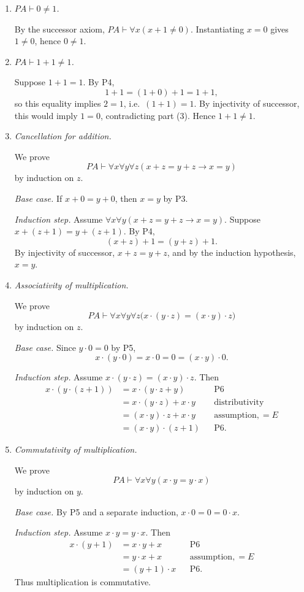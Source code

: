 \documentclass[12pt,fleqn]{article}
\begin{document}
\begin{enumerate}
\item \emph{$PA\vdash 0\neq 1$.}

By the successor axiom, $PA\vdash\forall x(x+1\neq 0)$.
Instantiating $x=0$ gives $1\neq 0$, hence $0\neq 1$.

\item \emph{$PA\vdash 1+1\neq 1$.}

Suppose $1+1=1$. By P4,
\[
1+1=(1+0)+1=1+1,
\]
so this equality implies $2=1$, i.e.\ $(1+1)=1$.
By injectivity of successor, this would imply $1=0$, contradicting
part (3). Hence $1+1\neq 1$.

\item \emph{Cancellation for addition.}

We prove
\[
PA\vdash\forall x\forall y\forall z(x+z=y+z\to x=y)
\]
by induction on $z$.

\emph{Base case.} If $x+0=y+0$, then $x=y$ by P3.

\emph{Induction step.} Assume
$\forall x\forall y(x+z=y+z\to x=y)$.
Suppose $x+(z+1)=y+(z+1)$. By P4,
\[
(x+z)+1=(y+z)+1.
\]
By injectivity of successor, $x+z=y+z$, and by the induction hypothesis,
$x=y$.

\item \emph{Associativity of multiplication.}

We prove
\[
PA\vdash\forall x\forall y\forall z\bigl(x\cdot(y\cdot z)=(x\cdot y)\cdot z\bigr)
\]
by induction on $z$.

\emph{Base case.} Since $y\cdot 0=0$ by P5,
\[
x\cdot(y\cdot 0)=x\cdot 0=0=(x\cdot y)\cdot 0.
\]

\emph{Induction step.} Assume
$x\cdot(y\cdot z)=(x\cdot y)\cdot z$. Then
\[
\begin{aligned}
x\cdot(y\cdot(z+1))
 &= x\cdot(y\cdot z+y) && \text{P6} \\
 &= x\cdot(y\cdot z)+x\cdot y && \text{distributivity} \\
 &= (x\cdot y)\cdot z+x\cdot y && \text{assumption}, =E \\
 &= (x\cdot y)\cdot(z+1) && \text{P6}.
\end{aligned}
\]

\item \emph{Commutativity of multiplication.}

We prove
\[
PA\vdash\forall x\forall y(x\cdot y=y\cdot x)
\]
by induction on $y$.

\emph{Base case.} By P5 and a separate induction,
$x\cdot 0=0=0\cdot x$.

\emph{Induction step.} Assume $x\cdot y=y\cdot x$. Then
\[
\begin{aligned}
x\cdot(y+1) &= x\cdot y+x && \text{P6} \\
            &= y\cdot x+x && \text{assumption}, =E \\
            &= (y+1)\cdot x && \text{P6}.
\end{aligned}
\]
Thus multiplication is commutative.

\end{enumerate}
\end{document}
